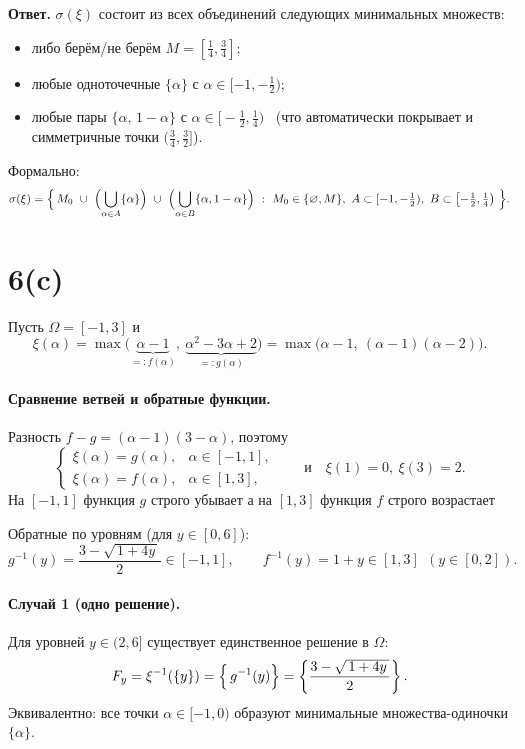\documentclass[12pt]{article}
\begin{document}
    \medskip
    \noindent\textbf{Ответ.} \(\sigma(\xi)\) состоит из всех объединений следующих минимальных множеств:
    \begin{itemize}
        \item либо берём/не берём \(M=[\tfrac{1}{4},\tfrac{3}{4}]\);
        \item любые одноточечные \(\{\alpha\}\) с \(\alpha\in[-1,-\tfrac{1}{2})\);
        \item любые пары \(\{\alpha,\,1-\alpha\}\) с \(\alpha\in\bigl[-\tfrac{1}{2},\tfrac{1}{4}\bigr)\)
        \ (что автоматически покрывает и симметричные точки \((\tfrac{3}{4},\tfrac{3}{2}]\)).
    \end{itemize}
    Формально:
    \[
        \sigma(\xi)=\Bigl\{\,
        M_0\ \cup\ \Bigl(\bigcup_{\alpha\in A}\{\alpha\}\Bigr)\ \cup\
        \Bigl(\bigcup_{\alpha\in B}\{\alpha,1-\alpha\}\Bigr)\ :
        \ M_0\in\{\varnothing,M\},\ A\subset[-1,-\tfrac{1}{2}),\ B\subset\bigl[-\tfrac{1}{2},\tfrac{1}{4}\bigr)
        \ \Bigr\}.
    \]


    \section*{6(c)}
    Пусть $\Omega=[-1,3]$ и
    \[
        \xi(\alpha)=\max\bigl(\underbrace{\alpha-1}_{=:f(\alpha)},\ \underbrace{\alpha^2-3\alpha+2}_{=:g(\alpha)}\bigr)
        =\max\bigl(\alpha-1,\ (\alpha-1)(\alpha-2)\bigr).
    \]

    \paragraph{Сравнение ветвей и обратные функции.}
    Разность $f-g=(\alpha-1)(3-\alpha)$, поэтому
    \[
        \begin{cases}
            \xi(\alpha)=g(\alpha), & \alpha\in[-1,1],\\
            \xi(\alpha)=f(\alpha), & \alpha\in[1,3],
        \end{cases}
        \qquad\text{и}\quad \xi(1)=0,\ \xi(3)=2.
    \]
    На $[-1,1]$ функция $g$ строго убывает
    а на $[1,3]$ функция $f$ строго возрастает

    Обратные по уровням (для $y\in[0,6]$):
    \[
        g^{-1}(y)=\frac{3-\sqrt{\,1+4y\,}}{2}\in[-1,1],\qquad
        f^{-1}(y)=1+y\in[1,3]\ \ (y\in[0,2]).
    \]

    \paragraph{Случай 1 (одно решение).}
    Для уровней $y\in(2,6]$ существует единственное решение в $\Omega$:
    \[
        F_y=\xi^{-1}(\{y\})=\Bigl\{\,g^{-1}(y)\Bigr\}=\left\{\frac{3-\sqrt{\,1+4y\,}}{2}\right\}.
    \]
    Эквивалентно: все точки $\alpha\in[-1,0)$ образуют минимальные множества-одиночки $\{\alpha\}$.
\end{document}
